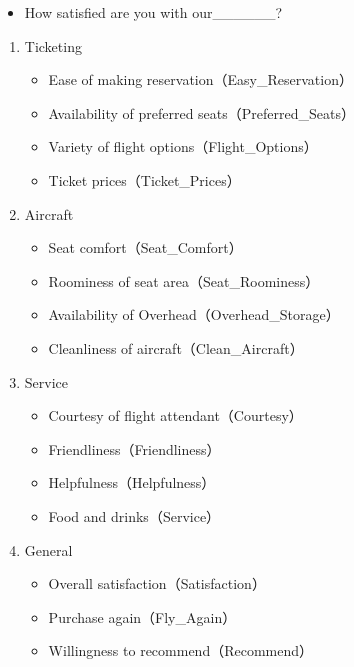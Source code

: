 \documentclass[12pt,]{krantz}
\providecommand{\tightlist}{%
  \setlength{\itemsep}{0pt}\setlength{\parskip}{0pt}}
\theoremstyle{definition}
\theoremstyle{definition}
\theoremstyle{definition}
\theoremstyle{remark}
\begin{document}
\begin{itemize}
\tightlist
\item
  How satisfied are you with our\_\_\_\_\_\_?
\end{itemize}

\begin{enumerate}
\def\labelenumi{\arabic{enumi}.}
\tightlist
\item
  Ticketing

  \begin{itemize}
  \tightlist
  \item
    Ease of making reservation（Easy\_Reservation）
  \item
    Availability of preferred seats（Preferred\_Seats）
  \item
    Variety of flight options（Flight\_Options）
  \item
    Ticket prices（Ticket\_Prices）
  \end{itemize}
\item
  Aircraft

  \begin{itemize}
  \tightlist
  \item
    Seat comfort（Seat\_Comfort）
  \item
    Roominess of seat area（Seat\_Roominess）
  \item
    Availability of Overhead（Overhead\_Storage）
  \item
    Cleanliness of aircraft（Clean\_Aircraft）
  \end{itemize}
\item
  Service

  \begin{itemize}
  \tightlist
  \item
    Courtesy of flight attendant（Courtesy）
  \item
    Friendliness（Friendliness）
  \item
    Helpfulness（Helpfulness）
  \item
    Food and drinks（Service）
  \end{itemize}
\item
  General

  \begin{itemize}
  \tightlist
  \item
    Overall satisfaction（Satisfaction）
  \item
    Purchase again（Fly\_Again）
  \item
    Willingness to recommend（Recommend）
  \end{itemize}
\end{enumerate}
\end{document}
